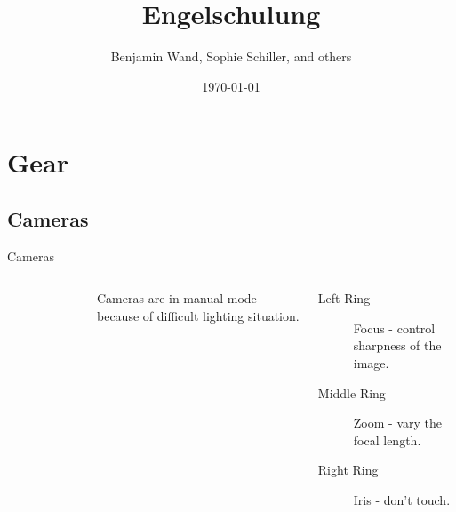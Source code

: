 \documentclass[hyperref={pdfpagelabels=false}]{beamer}
\title{Engelschulung}    %
\author{Benjamin Wand, Sophie Schiller, and others}   %
\date{\today}
\begin{document}
\begin{frame}
\titlepage
\end{frame} 


\begin{frame}  
\tableofcontents
\end{frame} 

\section{Gear}  %
\subsection{Cameras}
\begin{frame}{Cameras}
	\begin{columns}[T,onlytextwidth]
	\begin{figure} 
		\centering
		\def\svgwidth{1\textwidth}
		
	\end{figure}
	Cameras are in manual mode because of difficult lighting situation.
	\begin{description}
		\item[Left Ring] Focus - control sharpness of the image.
		\item[Middle Ring] Zoom - vary the focal length.
		\item[Right Ring] Iris - don't touch.
     \end{description}
\end{columns}
\end{frame}
\end{document}

